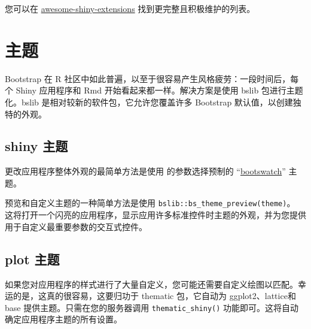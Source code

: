 您可以在 \href{https://github.com/nanxstats/awesome-shiny-extensions}{awesome-shiny-extensions} 找到更完整且积极维护的列表。
\section{主题}
Bootstrap 在 R 社区中如此普遍，以至于很容易产生风格疲劳：一段时间后，每个 Shiny 应用程序和 Rmd 开始看起来都一样。解决方案是使用 bslib 包进行主题化。bslib 是相对较新的软件包，它允许您覆盖许多 Bootstrap 默认值，以创建独特的外观。
\subsection{shiny 主题}
更改应用程序整体外观的最简单方法是使用 的参数选择预制的 “\href{https://bootswatch.com/}{bootswatch}” 主题。

预览和自定义主题的一种简单方法是使用 \verb|bslib::bs_theme_preview(theme)|。 这将打开一个闪亮的应用程序，显示应用许多标准控件时主题的外观，并为您提供用于自定义最重要参数的交互式控件。

\subsection{plot 主题}
如果您对应用程序的样式进行了大量自定义，您可能还需要自定义绘图以匹配。幸运的是，这真的很容易，这要归功于 thematic 包，它自动为 ggplot2、lattice和 base 提供主题。只需在您的服务器调用 \verb|thematic_shiny()| 功能即可。这将自动确定应用程序主题的所有设置。